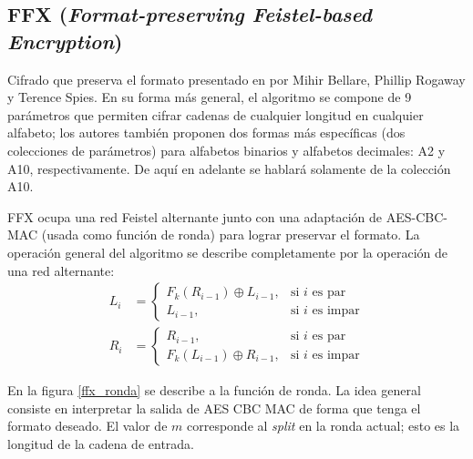 %
%

\subsection{FFX (\textit{Format-preserving Feistel-based Encryption})}

Cifrado que preserva el formato presentado en \cite{ffx_1} por Mihir Bellare,
Phillip Rogaway y Terence Spies.  En su forma más general, el algoritmo se
compone de 9 parámetros que permiten cifrar cadenas de cualquier longitud en
cualquier alfabeto; los autores también proponen dos formas más específicas (dos
colecciones de parámetros) para alfabetos binarios y alfabetos decimales: A2 y
A10, respectivamente. De aquí en adelante se hablará solamente de la colección
A10.


FFX ocupa una red Feistel alternante junto con una adaptación de AES-CBC-MAC
(usada como función de ronda) para lograr preservar el formato. La operación
general del algoritmo se describe completamente por la operación de una red
alternante:
\begin{equation}
  \begin{split}
    L_{i} &=
    \begin{cases}
      F_k(R_{i - 1}) \oplus L_{i - 1},  & \text{si } i \text{ es par} \\
      L_{i - 1},                          & \text{si } i \text{ es impar}
    \end{cases}
    \\
    R_{i} &=
    \begin{cases}
      R_{i - 1},                          & \text{si } i \text{ es par} \\
      F_k(L_{i - 1}) \oplus R_{i - 1},  & \text{si } i \text{ es impar}
    \end{cases}
  \end{split}
\end{equation}

En la figura \ref{ffx_ronda} se describe a la función de ronda. La idea general
consiste en interpretar la salida de AES CBC MAC de forma que tenga el formato
deseado. El valor de $ m $ corresponde al \textit{split} en la ronda actual;
esto es la longitud de la cadena de entrada.


